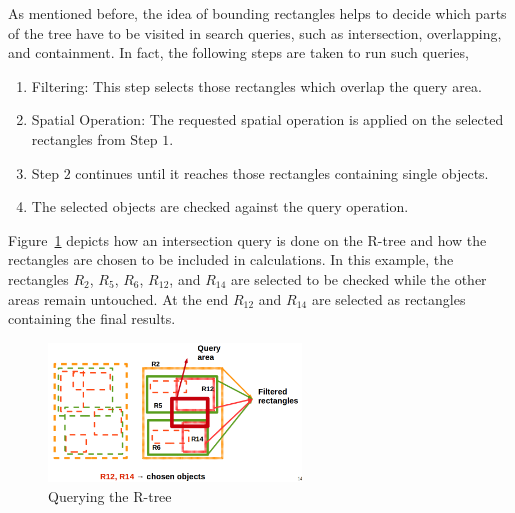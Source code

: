 \documentclass[a4paper,12pt]{article}
\begin{document}
As mentioned before, the idea of bounding rectangles helps to decide which parts of the tree have to be visited in search queries, such as intersection, overlapping, and containment. In fact, the following steps are taken to run such queries,
\begin{enumerate}
\item Filtering: This step selects those rectangles which overlap the query area.
\item Spatial Operation: The requested spatial operation is applied on the selected rectangles from Step $1$. 
\item Step $2$ continues until it reaches those rectangles containing single objects. 
\item The selected objects are checked against the query operation. 
\end{enumerate}
Figure~\ref{rtreequery} depicts how an intersection query is done on the R-tree and how the rectangles are chosen to be included in calculations. In this example, the rectangles $R_2$, $R_5$, $R_6$, $R_{12}$, and $R_{14}$ are selected to be checked while the other areas remain untouched. At the end $R_{12}$ and $R_{14}$ are selected as rectangles containing the final results.

\begin{figure}
\centering
\includegraphics[width=0.6\textwidth,height=0.2\textheight]{Rtree-query}
\caption{Querying the R-tree}
\label{rtreequery}
\end{figure}
\end{document}
